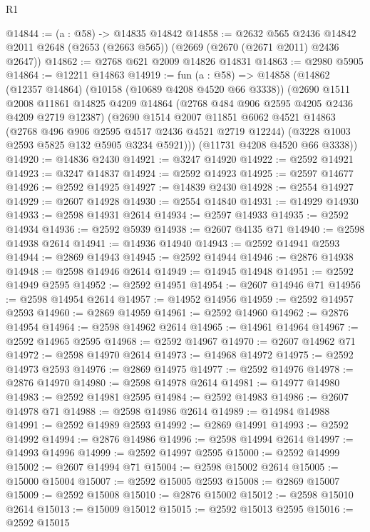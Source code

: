 \begin{lexlean}{R1}
\begin{coremodule}
@14844 := (a : @58) -> @14835 @14842
@14858 := @2632
    @565
    @2436
    @14842
    @2011
    @2648
    (@2653 (@2663 @565))
    (@2669 (@2670 (@2671 @2011) @2436 @2647))
@14862 := @2768 @621 @2009 @14826 @14831
@14863 := @2980 @5905
@14864 := @12211 @14863
@14919 := fun (a : @58) =>
  @14858
    (@14862
      (@12357 @14864)
      (@10158 (@10689 @4208 @4520 @66 @3338))
      (@2690
        @1511
        @2008
        @11861
        @14825
        @4209
        @14864
        (@2768 @484 @906 @2595 @4205 @2436 @4209 @2719 @12387)
        (@2690
          @1514
          @2007
          @11851
          @6062
          @4521
          @14863
          (@2768 @496 @906 @2595 @4517 @2436 @4521 @2719 @12244)
          (@3228 @1003 @2593 @5825 @132 @5905 @3234 @5921)))
      (@11731 @4208 @4520 @66 @3338))
@14920 := @14836 @2430
@14921 := @3247 @14920
@14922 := @2592 @14921
@14923 := @3247 @14837
@14924 := @2592 @14923
@14925 := @2597 @14677
@14926 := @2592 @14925
@14927 := @14839 @2430
@14928 := @2554 @14927
@14929 := @2607 @14928
@14930 := @2554 @14840
@14931 := @14929 @14930
@14933 := @2598 @14931 @2614
@14934 := @2597 @14933
@14935 := @2592 @14934
@14936 := @2592 @5939
@14938 := @2607 @4135 @71
@14940 := @2598 @14938 @2614
@14941 := @14936 @14940
@14943 := @2592 @14941 @2593
@14944 := @2869 @14943
@14945 := @2592 @14944
@14946 := @2876 @14938
@14948 := @2598 @14946 @2614
@14949 := @14945 @14948
@14951 := @2592 @14949 @2595
@14952 := @2592 @14951
@14954 := @2607 @14946 @71
@14956 := @2598 @14954 @2614
@14957 := @14952 @14956
@14959 := @2592 @14957 @2593
@14960 := @2869 @14959
@14961 := @2592 @14960
@14962 := @2876 @14954
@14964 := @2598 @14962 @2614
@14965 := @14961 @14964
@14967 := @2592 @14965 @2595
@14968 := @2592 @14967
@14970 := @2607 @14962 @71
@14972 := @2598 @14970 @2614
@14973 := @14968 @14972
@14975 := @2592 @14973 @2593
@14976 := @2869 @14975
@14977 := @2592 @14976
@14978 := @2876 @14970
@14980 := @2598 @14978 @2614
@14981 := @14977 @14980
@14983 := @2592 @14981 @2595
@14984 := @2592 @14983
@14986 := @2607 @14978 @71
@14988 := @2598 @14986 @2614
@14989 := @14984 @14988
@14991 := @2592 @14989 @2593
@14992 := @2869 @14991
@14993 := @2592 @14992
@14994 := @2876 @14986
@14996 := @2598 @14994 @2614
@14997 := @14993 @14996
@14999 := @2592 @14997 @2595
@15000 := @2592 @14999
@15002 := @2607 @14994 @71
@15004 := @2598 @15002 @2614
@15005 := @15000 @15004
@15007 := @2592 @15005 @2593
@15008 := @2869 @15007
@15009 := @2592 @15008
@15010 := @2876 @15002
@15012 := @2598 @15010 @2614
@15013 := @15009 @15012
@15015 := @2592 @15013 @2595
@15016 := @2592 @15015

\end{coremodule}
\end{lexlean}
